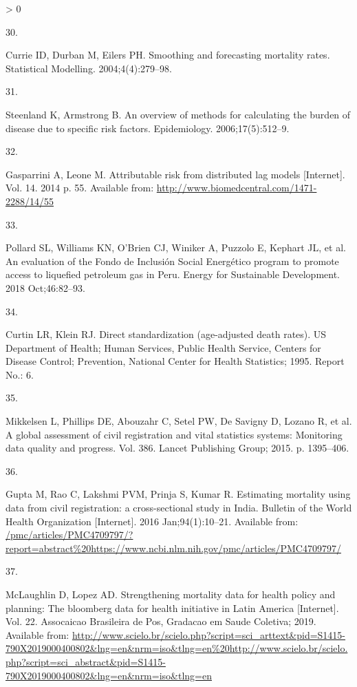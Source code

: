 \documentclass[
]{article}
\newlength{\cslhangindent}
\newlength{\csllabelwidth}
\newenvironment{CSLReferences}[2] %
 {%
  \setlength{\parindent}{0pt}
  \ifodd #1 \everypar{\setlength{\hangindent}{\cslhangindent}}\ignorespaces\fi
  \ifnum #2 > 0
  \setlength{\parskip}{#2\baselineskip}
  \fi
 }%
 {}
\newcommand{\CSLLeftMargin}[1]{\parbox[t]{\csllabelwidth}{#1}}
\newcommand{\CSLRightInline}[1]{\parbox[t]{\linewidth - \csllabelwidth}{#1}\break}
\begin{document}
\begin{CSLReferences}{0}{0}
\leavevmode\hypertarget{ref-Currie2004}{}%
\CSLLeftMargin{30. }
\CSLRightInline{Currie ID, Durban M, Eilers PH. {Smoothing and forecasting mortality rates}. Statistical Modelling. 2004;4(4):279--98. }

\leavevmode\hypertarget{ref-Steenland2006}{}%
\CSLLeftMargin{31. }
\CSLRightInline{Steenland K, Armstrong B. {An overview of methods for calculating the burden of disease due to specific risk factors}. Epidemiology. 2006;17(5):512--9. }

\leavevmode\hypertarget{ref-Gasparrini2014}{}%
\CSLLeftMargin{32. }
\CSLRightInline{Gasparrini A, Leone M. {Attributable risk from distributed lag models} {[}Internet{]}. Vol. 14. 2014 p. 55. Available from: \url{http://www.biomedcentral.com/1471-2288/14/55}}

\leavevmode\hypertarget{ref-Pollard2018}{}%
\CSLLeftMargin{33. }
\CSLRightInline{Pollard SL, Williams KN, O'Brien CJ, Winiker A, Puzzolo E, Kephart JL, et al. {An evaluation of the Fondo de Inclusi{ó}n Social Energ{é}tico program to promote access to liquefied petroleum gas in Peru}. Energy for Sustainable Development. 2018 Oct;46:82--93. }

\leavevmode\hypertarget{ref-Curtin1995}{}%
\CSLLeftMargin{34. }
\CSLRightInline{Curtin LR, Klein RJ. {Direct standardization (age-adjusted death rates)}. US Department of Health; Human Services, Public Health Service, Centers for Disease Control; Prevention, National Center for Health Statistics; 1995. Report No.: 6. }

\leavevmode\hypertarget{ref-Mikkelsen2015}{}%
\CSLLeftMargin{35. }
\CSLRightInline{Mikkelsen L, Phillips DE, Abouzahr C, Setel PW, De Savigny D, Lozano R, et al. {A global assessment of civil registration and vital statistics systems: Monitoring data quality and progress}. Vol. 386. Lancet Publishing Group; 2015. p. 1395--406. }

\leavevmode\hypertarget{ref-Gupta2016}{}%
\CSLLeftMargin{36. }
\CSLRightInline{Gupta M, Rao C, Lakshmi PVM, Prinja S, Kumar R. {Estimating mortality using data from civil registration: a cross-sectional study in India}. Bulletin of the World Health Organization {[}Internet{]}. 2016 Jan;94(1):10--21. Available from: \url{/pmc/articles/PMC4709797/?report=abstract\%20https://www.ncbi.nlm.nih.gov/pmc/articles/PMC4709797/}}

\leavevmode\hypertarget{ref-McLaughlin2019}{}%
\CSLLeftMargin{37. }
\CSLRightInline{McLaughlin D, Lopez AD. {Strengthening mortality data for health policy and planning: The bloomberg data for health initiative in Latin America} {[}Internet{]}. Vol. 22. Assocaicao Brasileira de Pos, Gradacao em Saude Coletiva; 2019. Available from: \url{http://www.scielo.br/scielo.php?script=sci_arttext\&pid=S1415-790X2019000400802\&lng=en\&nrm=iso\&tlng=en\%20http://www.scielo.br/scielo.php?script=sci_abstract\&pid=S1415-790X2019000400802\&lng=en\&nrm=iso\&tlng=en}}


\end{CSLReferences}
\end{document}
